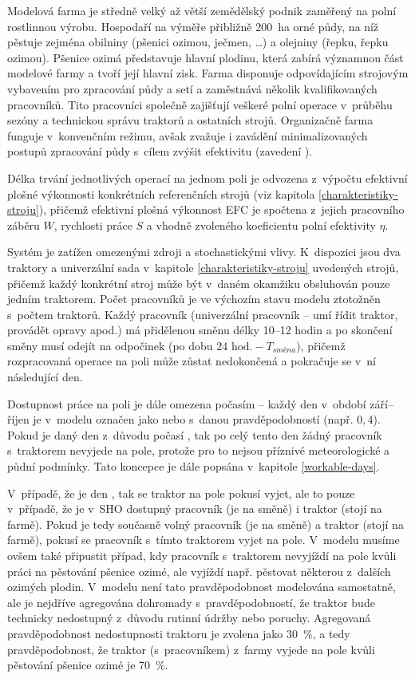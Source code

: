 \documentclass[11pt,a4paper]{article}
\begin{document}
Modelová farma je středně velký až větší zemědělský podnik zaměřený na polní rostlinnou výrobu. Hospodaří na výměře přibližně 200~ha orné půdy, na níž pěstuje zejména obilniny (pšenici ozimou, ječmen, \dots) a olejniny (řepku, řepku ozimou). Pšenice ozimá představuje hlavní plodinu, která zabírá významnou část modelové farmy a tvoří její hlavní zisk. Farma disponuje odpovídajícím strojovým vybavením pro zpracování půdy a setí a zaměstnává několik kvalifikovaných pracovníků. Tito pracovníci společně zajišťují veškeré polní operace v~průběhu sezóny a technickou správu traktorů a ostatních strojů. Organizačně farma funguje v~konvenčním režimu, avšak zvažuje i zavádění minimalizovaných postupů zpracování půdy s~cílem zvýšit efektivitu (zavedení \cite{kuhn-min-till}).

Délka trvání jednotlivých operací na jednom poli je odvozena z~výpočtu efektivní plošné výkonnosti konkrétních referenčních strojů (viz kapitola \ref{charakteristiky-stroju}), přičemž efektivní plošná výkonnost EFC je spočtena z~jejich pracovního záběru $W$, rychlosti práce $S$ a vhodně zvoleného koeficientu polní efektivity $\eta$.

Systém je zatížen omezenými zdroji a stochastickými vlivy. K~dispozici jsou dva traktory a univerzální sada v~kapitole \ref{charakteristiky-stroju} uvedených strojů, přičemž každý konkrétní stroj může být v~daném okamžiku obsluhován pouze jedním traktorem. Počet pracovníků je ve výchozím stavu modelu ztotožněn s~počtem traktorů. Každý pracovník (univerzální pracovník -- umí řídit traktor, provádět opravy apod.) má přidělenou směnu délky 10--12 hodin a po skončení směny musí odejít na odpočinek (po dobu $24\text{ hod.}-T_{směna}$), přičemž rozpracovaná operace na poli může zůstat nedokončená a pokračuje se v~ní následující  den.

Dostupnost práce na poli je dále omezena počasím -- každý den v~období září--říjen je v~modelu označen jako  nebo  s~danou pravděpodobností (např. $0,4$)\cite{workable-days}. Pokud je daný den z~důvodu počasí , tak po celý tento den žádný pracovník s~traktorem nevyjede na pole, protože pro to nejsou příznivé meteorologické a půdní podmínky. Tato koncepce je dále popsána v~kapitole \ref{workable-days}.

V~případě, že je den , tak se traktor na pole pokusí vyjet, ale to pouze v~případě, že je v~SHO dostupný pracovník (je na směně) i traktor (stojí na farmě). Pokud je tedy současně volný pracovník (je na směně) a traktor (stojí na farmě), pokusí se pracovník s~tímto traktorem vyjet na pole. V~modelu musíme ovšem také připustit případ, kdy pracovník s~traktorem nevyjíždí na pole kvůli práci na pěstování pšenice ozimé, ale vyjíždí např. pěstovat některou z~dalších ozimých plodin. V~modelu není tato pravděpodobnost modelována samostatně, ale je nejdříve agregována dohromady s~pravděpodobností, že traktor bude technicky nedostupný z~důvodu rutinní údržby nebo poruchy. Agregovaná pravděpodobnost nedostupnosti traktoru je zvolena jako 30~\%, a tedy pravděpodobnost, že traktor (s~pracovníkem) z~farmy vyjede na pole kvůli pěstování pšenice ozimé je 70~\%.
\end{document}
